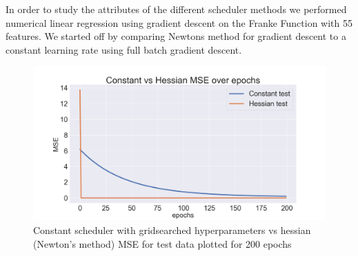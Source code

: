 \documentclass[onecolumn,10pt,cleanfoot]{asme2ej}
\begin{document}
In order to study the attributes of the different scheduler methods we performed numerical linear regression using gradient descent on the Franke Function with 55 features. We started off by comparing Newtons method for gradient descent to a constant learning rate using full batch gradient descent.

\begin{figure}[h]
\centerline{\includegraphics[width=5in]{figure/constant_v_hessian.png}}
\caption{Constant scheduler with gridsearched hyperparameters vs hessian (Newton's method) MSE for test data plotted for 200 epochs}
\label{constant_v_hessian}
\end{figure}
\end{document}
